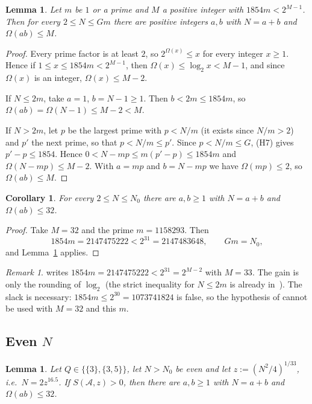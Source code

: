\documentclass[preprint,11pt]{elsarticle}
\newtheorem{lemma}[theorem]{Lemma}
\newtheorem{corollary}[theorem]{Corollary}
\theoremstyle{definition}
\theoremstyle{remark}
\newtheorem{remark}[theorem]{Remark}
\newcommand{\cA}{\mathcal{A}}
\newcommand{\C}{\cite{Campbell2026}}
\numberwithin{equation}{section}
\begin{document}
\begin{lemma}\label{lem:gap}
Let $m$ be $1$ or a prime and $M$ a positive integer with
$1854m<2^{M-1}$. Then for every $2\le N\le Gm$ there are positive integers
$a,b$ with $N=a+b$ and $\Omega(ab)\le M$.
\end{lemma}

\begin{proof}
Every prime factor is at least $2$, so $2^{\Omega(x)}\le x$ for every
integer $x\ge1$. Hence if $1\le x\le1854m<2^{M-1}$, then
$\Omega(x)\le\log_2x<M-1$, and since $\Omega(x)$ is an integer,
$\Omega(x)\le M-2$.

If $N\le 2m$, take $a=1$, $b=N-1\ge1$. Then $b<2m\le1854m$, so
$\Omega(ab)=\Omega(N-1)\le M-2<M$.

If $N>2m$, let $p$ be the largest prime with $p<N/m$ (it exists since
$N/m>2$) and $p'$ the next prime, so that $p<N/m\le p'$. Since
$p<N/m\le G$, (H7) gives $p'-p\le1854$. Hence
$0<N-mp\le m(p'-p)\le1854m$ and $\Omega(N-mp)\le M-2$. With $a=mp$ and
$b=N-mp$ we have $\Omega(mp)\le2$, so $\Omega(ab)\le M$.
\end{proof}

\begin{corollary}\label{cor:small}
For every $2\le N\le N_0$ there are $a,b\ge1$ with $N=a+b$ and
$\Omega(ab)\le32$.
\end{corollary}

\begin{proof}
Take $M=32$ and the prime $m=1158293$. Then
\[
  1854m=2147475222<2^{31}=2147483648,\qquad Gm=N_0,
\]
and Lemma~\ref{lem:gap} applies.
\end{proof}

\begin{remark}
\cite[Case~1]{Campbell2026} writes $1854m=2147475222<2^{31}=2^{M-2}$ with
$M=33$. The gain is only the rounding of $\log_2$ (the strict inequality
for $N\le2m$ is already in~\C). The slack is necessary:
$1854m\le2^{30}=1073741824$ is false, so the hypothesis of
\cite[Lemma~5.1]{Campbell2026} cannot be used with $M=32$ and this $m$.
\end{remark}

\subsection{\texorpdfstring{Even $N$}{Even N}}

\begin{lemma}\label{lem:even}
Let $Q\in\{\{3\},\{3,5\}\}$, let $N>N_0$ be even and let
$z:=(N^2/4)^{1/33}$, i.e.\ $N=2z^{16.5}$. If $S(\cA,z)>0$, then there are
$a,b\ge1$ with $N=a+b$ and $\Omega(ab)\le32$.
\end{lemma}
\end{document}
